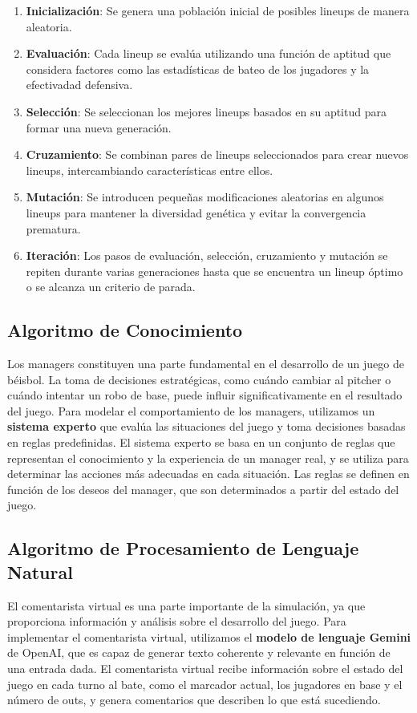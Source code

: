\documentclass[runningheads]{llncs}
\begin{document}
        \begin{enumerate}
            \item \textbf{Inicialización}: Se genera una población inicial de posibles lineups de manera aleatoria.
            \item \textbf{Evaluación}: Cada lineup se evalúa utilizando una función de aptitud que considera factores como las estadísticas de bateo de los jugadores y la efectivadad defensiva.
            \item \textbf{Selección}: Se seleccionan los mejores lineups basados en su aptitud para formar una nueva generación.
            \item \textbf{Cruzamiento}: Se combinan pares de lineups seleccionados para crear nuevos lineups, intercambiando características entre ellos.
            \item \textbf{Mutación}: Se introducen pequeñas modificaciones aleatorias en algunos lineups para mantener la diversidad genética y evitar la convergencia prematura.
            \item \textbf{Iteración}: Los pasos de evaluación, selección, cruzamiento y mutación se repiten durante varias generaciones hasta que se encuentra un lineup óptimo o se alcanza un criterio de parada.
        \end{enumerate}

    \subsection{Algoritmo de Conocimiento}
        Los managers constituyen una parte fundamental en el desarrollo de un juego de béisbol. La toma de decisiones estratégicas, como cuándo cambiar al pitcher o cuándo intentar un robo de base, puede influir significativamente en el resultado del juego. Para modelar el comportamiento de los managers, utilizamos un \textbf{sistema experto} que evalúa las situaciones del juego y toma decisiones basadas en reglas predefinidas. El sistema experto se basa en un conjunto de reglas que representan el conocimiento y la experiencia de un manager real, y se utiliza para determinar las acciones más adecuadas en cada situación. Las reglas se definen en función de los deseos del manager, que son determinados a partir del estado del juego. 

    \subsection{Algoritmo de Procesamiento de Lenguaje Natural}
        El comentarista virtual es una parte importante de la simulación, ya que proporciona información y análisis sobre el desarrollo del juego. Para implementar el comentarista virtual, utilizamos el \textbf{modelo de lenguaje Gemini} de OpenAI, que es capaz de generar texto coherente y relevante en función de una entrada dada. El comentarista virtual recibe información sobre el estado del juego en cada turno al bate, como el marcador actual, los jugadores en base y el número de outs, y genera comentarios que describen lo que está sucediendo.
\end{document}
